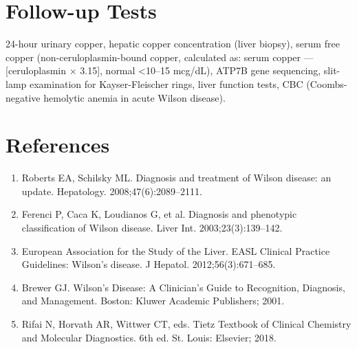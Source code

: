 \section*{Follow-up Tests}
24-hour urinary copper, hepatic copper concentration (liver biopsy), serum free copper (non-ceruloplasmin-bound copper, calculated as: serum copper --- [ceruloplasmin $\times$ 3.15], normal <10--15 mcg/dL), ATP7B gene sequencing, slit-lamp examination for Kayser-Fleischer rings, liver function tests, CBC (Coombs-negative hemolytic anemia in acute Wilson disease).
\section*{References}
\begin{enumerate}
  \item Roberts EA, Schilsky ML. Diagnosis and treatment of Wilson disease: an update. Hepatology. 2008;47(6):2089--2111.
  \item Ferenci P, Caca K, Loudianos G, et al. Diagnosis and phenotypic classification of Wilson disease. Liver Int. 2003;23(3):139--142.
  \item European Association for the Study of the Liver. EASL Clinical Practice Guidelines: Wilson's disease. J Hepatol. 2012;56(3):671--685.
  \item Brewer GJ. Wilson's Disease: A Clinician's Guide to Recognition, Diagnosis, and Management. Boston: Kluwer Academic Publishers; 2001.
  \item Rifai N, Horvath AR, Wittwer CT, eds. Tietz Textbook of Clinical Chemistry and Molecular Diagnostics. 6th ed. St. Louis: Elsevier; 2018.
\end{enumerate}
\clearpage
